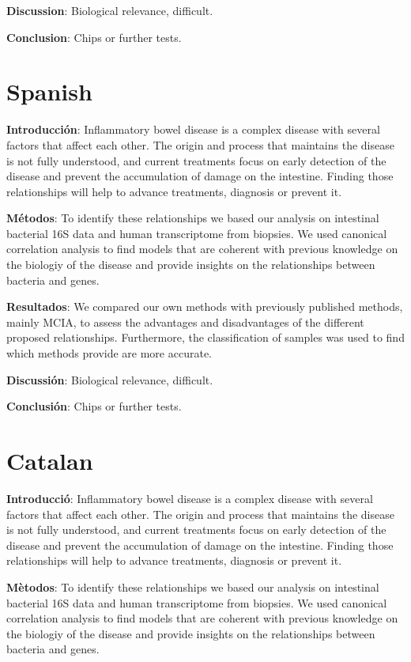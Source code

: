 \documentclass[
  a4paper,
]{book}
\begin{document}
\textbf{Discussion}: Biological relevance, difficult.

\textbf{Conclusion}: Chips or further tests.

\hypertarget{spanish}{%
\section*{Spanish}\label{spanish}}

\textbf{Introducción}: Inflammatory bowel disease is a complex disease with several factors that affect each other.
The origin and process that maintains the disease is not fully understood, and current treatments focus on early detection of the disease and prevent the accumulation of damage on the intestine.
Finding those relationships will help to advance treatments, diagnosis or prevent it.

\textbf{Métodos}: To identify these relationships we based our analysis on intestinal bacterial 16S data and human transcriptome from biopsies.
We used canonical correlation analysis to find models that are coherent with previous knowledge on the biologiy of the disease and provide insights on the relationships between bacteria and genes.

\textbf{Resultados}: We compared our own methods with previously published methods, mainly MCIA, to assess the advantages and disadvantages of the different proposed relationships.
Furthermore, the classification of samples was used to find which methods provide are more accurate.

\textbf{Discussión}: Biological relevance, difficult.

\textbf{Conclusión}: Chips or further tests.

\hypertarget{catalan}{%
\section*{Catalan}\label{catalan}}

\textbf{Introducció}: Inflammatory bowel disease is a complex disease with several factors that affect each other.
The origin and process that maintains the disease is not fully understood, and current treatments focus on early detection of the disease and prevent the accumulation of damage on the intestine.
Finding those relationships will help to advance treatments, diagnosis or prevent it.

\textbf{Mètodos}: To identify these relationships we based our analysis on intestinal bacterial 16S data and human transcriptome from biopsies.
We used canonical correlation analysis to find models that are coherent with previous knowledge on the biologiy of the disease and provide insights on the relationships between bacteria and genes.
\end{document}
